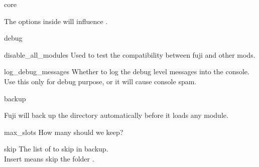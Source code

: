 \label{ch:configuration}



\begin{Configuration}
    \item[core]{
        The  options inside  will influence .

        \begin{NestedList}
            \item[debug]{
                \item[]

                \begin{NestedList}
                    \item[disable\_all\_modules]{
                        Used to test the compatibility between fuji and other mods.
                    }

                    \item[log\_debug\_messages]{
                        Whether to log the debug level messages into the console. Use this only for debug purpose, or it will cause console spam.
                    }

                \end{NestedList}

            }
        \end{NestedList}

        \begin{NestedList}
            \item[backup]{
                Fuji will back up the  directory automatically before it loads any module.

                \begin{NestedList}
                    \item[max\_slots]{
                        How many  should we keep?
                    }

                    \item[skip]{
                        The list of  to skip in backup. \\
                        Insert  means skip the folder .
                    }
                \end{NestedList}
            }
        \end{NestedList}


}
\end{Configuration}
